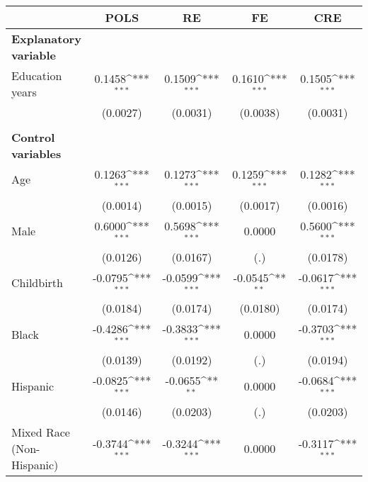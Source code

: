 {
\def\sym#1{\ifmmode^{#1}\else\(^{#1}\)\fi}
\begin{tabular}{l*{4}{c}}
\toprule
                    &\multicolumn{1}{c}{POLS}&\multicolumn{1}{c}{RE}&\multicolumn{1}{c}{FE}&\multicolumn{1}{c}{CRE}\\
\midrule
\textbf{Explanatory variable}&                     &                     &                     &                     \\
Education years     &      0.1458\sym{***}&      0.1509\sym{***}&      0.1610\sym{***}&      0.1505\sym{***}\\
                    &    (0.0027)         &    (0.0031)         &    (0.0038)         &    (0.0031)         \\
\\ \textbf{Control variables}&                     &                     &                     &                     \\
Age                 &      0.1263\sym{***}&      0.1273\sym{***}&      0.1259\sym{***}&      0.1282\sym{***}\\
                    &    (0.0014)         &    (0.0015)         &    (0.0017)         &    (0.0016)         \\
Male                &      0.6000\sym{***}&      0.5698\sym{***}&      0.0000         &      0.5600\sym{***}\\
                    &    (0.0126)         &    (0.0167)         &         (.)         &    (0.0178)         \\
Childbirth          &     -0.0795\sym{***}&     -0.0599\sym{***}&     -0.0545\sym{**} &     -0.0617\sym{***}\\
                    &    (0.0184)         &    (0.0174)         &    (0.0180)         &    (0.0174)         \\
Black               &     -0.4286\sym{***}&     -0.3833\sym{***}&      0.0000         &     -0.3703\sym{***}\\
                    &    (0.0139)         &    (0.0192)         &         (.)         &    (0.0194)         \\
Hispanic            &     -0.0825\sym{***}&     -0.0655\sym{**} &      0.0000         &     -0.0684\sym{***}\\
                    &    (0.0146)         &    (0.0203)         &         (.)         &    (0.0203)         \\
Mixed Race (Non-Hispanic)&     -0.3744\sym{***}&     -0.3244\sym{***}&      0.0000         &     -0.3117\sym{***}\\

\end{tabular}}
